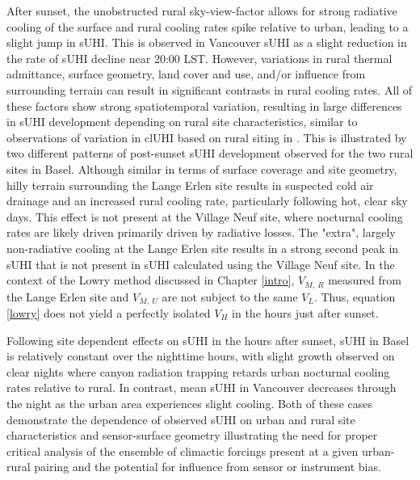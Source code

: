 \begin{bibunit}
After sunset, the unobstructed rural sky-view-factor allows for strong radiative cooling of the surface and rural cooling rates spike relative to urban, leading to a slight jump in sUHI. This is observed in Vancouver sUHI as a slight reduction in the rate of sUHI decline near 20:00 LST. However, variations in rural thermal admittance, surface geometry, land cover and use, and/or influence from surrounding terrain can result in significant contrasts in rural cooling rates. All of these factors show strong spatiotemporal variation, resulting in large differences in sUHI development depending on rural site characteristics, similar to observations of variation in clUHI based on rural siting in \citep{Runnalls2000}. This is illustrated by two different patterns of post-sunset sUHI development observed for the two rural sites in Basel. Although similar in terms of surface coverage and site geometry, hilly terrain surrounding the Lange Erlen site results in suspected cold air drainage and an increased rural cooling rate, particularly following hot, clear sky days. This effect is not present at the Village Neuf site, where nocturnal cooling rates are likely driven primarily driven by radiative losses. The "extra", largely non-radiative cooling at the Lange Erlen site results in a strong second peak in sUHI that is not present in sUHI calculated using the Village Neuf site. In the context of the Lowry method discussed in Chapter \ref{intro}, $V_{M, \ R}$ measured from the Lange Erlen site and $V_{M, \ U}$ are not subject to the same $V_{L}$. Thus, equation \ref{lowry} does not yield a perfectly isolated $V_{H}$ in the hours just after sunset. 

Following site dependent effects on sUHI in the hours after sunset, sUHI in Basel is relatively constant over the nighttime hours, with slight growth observed on clear nights where canyon radiation trapping retards urban nocturnal cooling rates relative to rural. In contrast, mean sUHI in Vancouver decreases through the night as the urban area experiences slight cooling. Both of these cases demonstrate the dependence of observed sUHI on urban and rural site characteristics and sensor-surface geometry illustrating the need for proper critical analysis of the ensemble of climactic forcings present at a given urban-rural pairing and the potential for influence from sensor or instrument bias.



\end{bibunit}
